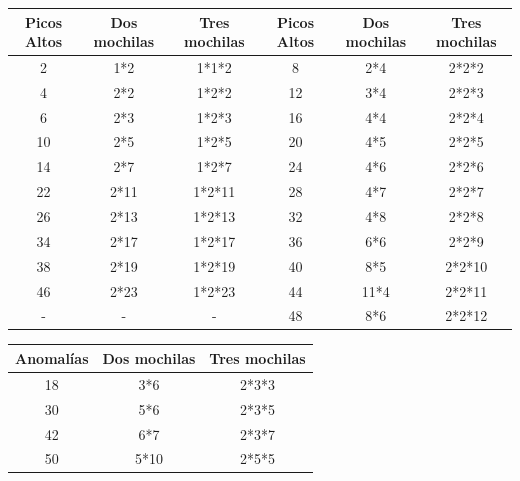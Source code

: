 \documentclass[spanish,12pt]{article}
\begin{document}
{\begin{center}
 \begin{tabular}{|c |c |c|||c|c|c|} 
 \hline
 Picos Altos & Dos mochilas & Tres mochilas&Picos Altos & Dos mochilas & Tres mochilas\\ [0.5ex] 
 \hline\hline
 2 & 1*2 & 1*1*2 & 8 & 2*4 & 2*2*2 \\ 
 \hline
 4 & 2*2 & 1*2*2 & 12 & 3*4 & 2*2*3\\
 \hline
 6 & 2*3 & 1*2*3 & 16 & 4*4 & 2*2*4\\
 \hline
 10 & 2*5 & 1*2*5 & 20 & 4*5 & 2*2*5 \\
 \hline
 14 & 2*7 & 1*2*7 & 24 & 4*6 & 2*2*6 \\
 \hline
 22 & 2*11 & 1*2*11 & 28 & 4*7 & 2*2*7\\
 \hline
 26 & 2*13 & 1*2*13 & 32 & 4*8 & 2*2*8\\
 \hline
 34 & 2*17 & 1*2*17 & 36 & 6*6 & 2*2*9\\
 \hline
 38 & 2*19 & 1*2*19 & 40 & 8*5 & 2*2*10\\
 \hline
 46 & 2*23 & 1*2*23 & 44 & 11*4 & 2*2*11\\  
 \hline
- & - & - & 48 & 8*6 & 2*2*12\\ [1ex] 
 \hline
\end{tabular}
\end{center}



\begin{center}
 \begin{tabular}{|c | c | c|} 
 \hline
 Anomalías & Dos mochilas & Tres mochilas  \\ [0.5ex] 
 \hline\hline
 18 & 3*6 & 2*3*3  \\ 
 \hline
 30 & 5*6 & 2*3*5 \\
 \hline
 42 & 6*7 & 2*3*7 \\
 \hline
 50 & 5*10 & 2*5*5  \\ [1ex] 
 \hline
\end{tabular}
\end{center}




}
\end{document}
